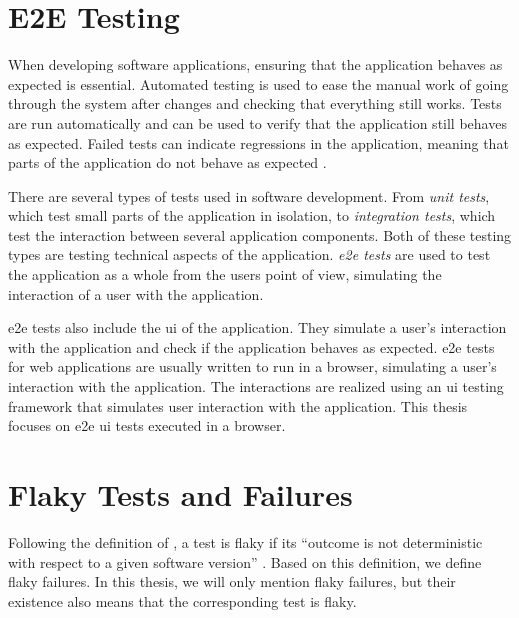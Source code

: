 \section{E2E Testing}

When developing software applications, ensuring that the application behaves as expected is essential.
Automated testing is used to ease the manual work of going through the system after changes and checking that everything still works.
Tests are run automatically and can be used to verify that the application still behaves as expected.
Failed tests can indicate regressions in the application, meaning that parts of the application do not behave as expected \autocite{lam_large-scale_2020, luo_empirical_2014,romano_empirical_2021}.

There are several types of tests used in software development.
From \emph{unit tests}, which test small parts of the application in isolation, to \emph{integration tests}, which test the interaction between several application components.
Both of these testing types are testing technical aspects of the application.
\emph{\ac{e2e} tests} are used to test the application as a whole from the users point of view, simulating the interaction of a user with the \autocite{jacob_schmitt_what_2022} application.

\Ac{e2e} tests also include the \ac{ui} of the application.
They simulate a user's interaction with the application and check if the application behaves as expected.
\ac{e2e} tests for web applications are usually written to run in a browser, simulating a user's interaction with the application.
The interactions are realized using an \ac{ui} testing framework that simulates user interaction with the application.
This thesis focuses on \ac{e2e} \ac{ui} tests executed in a browser.


\section{Flaky Tests and Failures}

Following the definition of \citeauthor*{luo_empirical_2014} \autocite{luo_empirical_2014}, a test is flaky if its \enquote{outcome is not deterministic with respect to a given software version} \autocite{luo_empirical_2014}.
Based on this definition, we define flaky failures.
In this thesis, we will only mention flaky failures, but their existence also means that the corresponding test is flaky.

